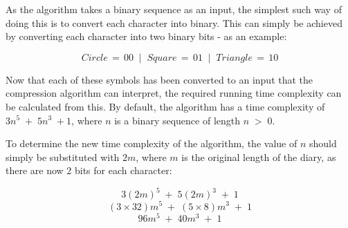 \documentclass{article}
\begin{document}
	As the algorithm takes a binary sequence as an input, the simplest such way of doing this is to convert each character into binary. This can simply be achieved by converting each character into two binary bits - as an example:
	
	\[Circle\,=\,00\;\;|\;\;Square\,=\,01\;\;|\;\;Triangle\,=\,10\]
	
	Now that each of these symbols has been converted to an input that the compression algorithm can interpret, the required running time complexity can be calculated from this. By default, the algorithm has a time complexity of \(3n^{5}\;+\;5n^{3}\;+1\), where $n$ is a binary sequence of length \(n\;>\;0\).
	
	To determine the new time complexity of the algorithm, the value of $n$ should simply be substituted with $2m$, where $m$ is the original length of the diary, as there are now 2 bits for each character:
	
	\[3(2m)^{5}\;+\;5(2m)^{3}\;+\;1\]
	\[(3\times32)m^{5}\;+\;(5\times8)m^{3}\;+\;1\]
	\[96m^{5}\;+\;40m^{3}\;+\;1\]
\end{document}
